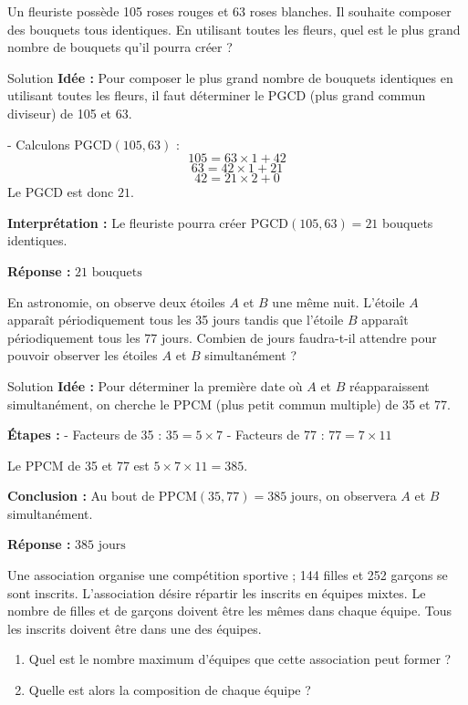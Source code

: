 \documentclass[a4paper,12pt]{article}
\begin{document}
\begin{exercice}[title=Exercice 3 $\quad \star \quad$ { [Modéliser, Calculer] }]
Un fleuriste possède 105 roses rouges et 63 roses blanches. Il souhaite composer des bouquets tous identiques.  
En utilisant toutes les fleurs, quel est le plus grand nombre de bouquets qu’il pourra créer ?
\end{exercice}

\begin{solutionbox}{Solution}
\textbf{Idée :} Pour composer le plus grand nombre de bouquets identiques en utilisant toutes les fleurs, il faut déterminer le PGCD (plus grand commun diviseur) de 105 et 63.

- Calculons $\mathrm{PGCD}(105,63)$ :  
  \[
  105 = 63 \times 1 + 42
  \]
  \[
  63 = 42 \times 1 + 21
  \]
  \[
  42 = 21 \times 2 + 0
  \]
  Le PGCD est donc $21$.

\textbf{Interprétation :}  
Le fleuriste pourra créer $\mathrm{PGCD}(105,63) = 21$ bouquets identiques.

\textbf{Réponse :}  
$\boxed{21 \text{ bouquets}}$
\end{solutionbox}

\begin{exercice}[title=Exercice 4 $\quad \star \quad$ { [Modéliser, Calculer] }]
En astronomie, on observe deux étoiles $A$ et $B$ une même nuit. L’étoile $A$ apparaît périodiquement tous les 35 jours tandis que l’étoile $B$ apparaît périodiquement tous les 77 jours.  
Combien de jours faudra-t-il attendre pour pouvoir observer les étoiles $A$ et $B$ simultanément ?
\end{exercice}

\begin{solutionbox}{Solution}
\textbf{Idée :} Pour déterminer la première date où $A$ et $B$ réapparaissent simultanément, on cherche le PPCM (plus petit commun multiple) de 35 et 77.

\textbf{Étapes :}
- Facteurs de 35 : $35 = 5 \times 7$
- Facteurs de 77 : $77 = 7 \times 11$

Le PPCM de 35 et 77 est $5 \times 7 \times 11 = 385$.

\textbf{Conclusion :}  
Au bout de $\mathrm{PPCM}(35,77)=385$ jours, on observera $A$ et $B$ simultanément.

\textbf{Réponse :}  
$\boxed{385 \text{ jours}}$
\end{solutionbox}

\begin{exercice}[title=Exercice 5 $\quad \star \quad$ { [Modéliser, Calculer] }]
Une association organise une compétition sportive ; 144 filles et 252 garçons se sont inscrits. L’association désire répartir les inscrits en équipes mixtes. Le nombre de filles et de garçons doivent être les mêmes dans chaque équipe. Tous les inscrits doivent être dans une des équipes.  
\begin{enumerate}
    \item Quel est le nombre maximum d’équipes que cette association peut former ?
    \item Quelle est alors la composition de chaque équipe ?
\end{enumerate}
\end{exercice}
\end{document}
